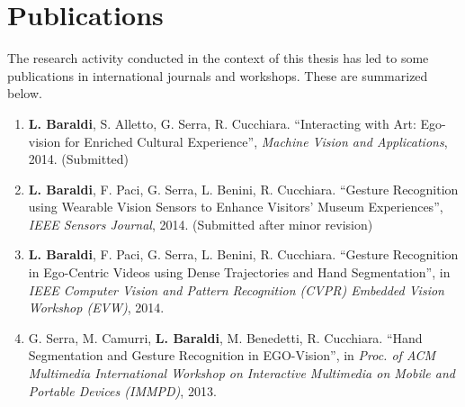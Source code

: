 
\chapter{Publications} %

\label{AppendixA} %


The research activity conducted in the context of this thesis has led to some publications in international journals
and workshops. These are summarized below.

\begin{enumerate}
\item \textbf{L. Baraldi}, S. Alletto, G. Serra, R. Cucchiara. ``Interacting with Art: Ego-vision for Enriched Cultural Experience'', \textit{Machine Vision and Applications}, 2014. (Submitted)
\item \textbf{L. Baraldi}, F. Paci, G. Serra, L. Benini, R. Cucchiara. ``Gesture Recognition using Wearable Vision Sensors to Enhance Visitors’ Museum Experiences'', \textit{IEEE Sensors Journal}, 2014. (Submitted after minor revision)
\item \textbf{L. Baraldi}, F. Paci, G. Serra, L. Benini, R. Cucchiara. ``Gesture Recognition in Ego-Centric Videos using Dense Trajectories and Hand Segmentation'', in \textit{IEEE Computer Vision and Pattern Recognition (CVPR) Embedded Vision Workshop (EVW)}, 2014.
\item G. Serra, M. Camurri, \textbf{L. Baraldi}, M. Benedetti, R. Cucchiara. ``Hand Segmentation and Gesture Recognition in EGO-Vision'', in \textit{Proc. of ACM Multimedia International Workshop on Interactive Multimedia on Mobile and Portable Devices (IMMPD)}, 2013.
\end{enumerate}